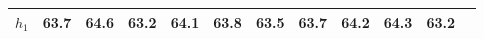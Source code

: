 
        \begin{tabular}{c|*{11}{c}}
            \hline
            \hline
                \(h_{1}\) &63.7& 64.6 & 63.2 & 64.1 & 63.8 & 63.5 & 63.7 & 64.2 & 64.3 & 63.2 \\
            \hline
            \hline
        \end{tabular}
        